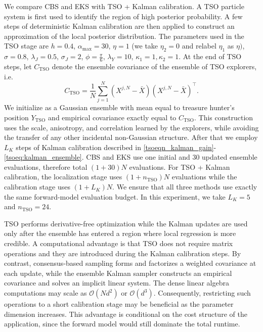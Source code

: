 \documentclass{article}
\numberwithin{equation}{section}
\begin{document}
 We compare CBS and EKS with TSO + Kalman calibration. A TSO particle system is first used to identify the region of high posterior probability. A few steps of deterministic Kalman calibration are then applied to construct an approximation of the local posterior distribution.
The parameters used in the TSO stage are
$h=0.4$, $\alpha_{\max}=30$, $\eta=1$ (we take $\eta_2 = 0$ and relabel $\eta_1$ as $\eta)$, $\sigma =0.8$, $\lambda_J =0.5$, $\sigma_J=2$, $\phi =\frac{\pi}{6}$, $\lambda_Y =10$, $
    \kappa_1 =1 , \kappa_2 = 1$.
 At the end of TSO steps, let $C_{\mathrm{TSO}}$ denote the ensemble covariance of the ensemble of TSO explorers, i.e.  
\begin{equation}
    C_{\mathrm{TSO}} =
    \frac{1}{N}
    \sum_{j=1}^{N}
    ( X^{j,N}
        - \bar{X})(X^{j,N} -
        \bar{X})^\top.
\end{equation}
We initialize as a Gaussian ensemble with mean equal to treasure hunter's position $Y_{\mathrm{TSO}}$ and empirical covariance exactly equal to $C_{\mathrm{TSO}}$. This construction uses the scale, anisotropy, and correlation learned by the explorers, while avoiding the transfer of any other incidental non-Gaussian structure. After that we employ $L_K$ steps of Kalman calibration described in \eqref{tsoeqn_kalman_gain}-\eqref{tsoeq:kalman_ensemble}.  
CBS and EKS use one initial and $30$ updated ensemble evaluations, therefore total $(1+30)N$ evaluations. For TSO + Kalman calibration, the localization stage uses  $(1+ n_{\mathrm{TSO}})N$ evaluations
while the calibration stage uses $(1+ L_K)N$. We ensure that all three methods use exactly the same forward-model evaluation budget. In this experiment, we take $L_K = 5$ and $n_{\mathrm{TSO}} = 24$.  


TSO performs derivative-free optimization  while the Kalman updates are used only after the ensemble has entered a region where local regression is more credible.
A computational advantage is that TSO  does not require matrix operations and they are introduced  during the Kalman calibration steps. By contrast, consensus-based sampling forms and factorizes a weighted covariance at each update, while the ensemble Kalman sampler constructs an empirical covariance and solves an implicit linear system. The dense linear algebra computations may scale as $\mathcal{O}(Nd^2)$ or $\mathcal{O}(d^3)$. Consequently, restricting such operations to a short calibration stage may be beneficial as the parameter dimension increases. This advantage is conditional on the cost structure of the application, since the forward model would still dominate the total runtime.
\end{document}

